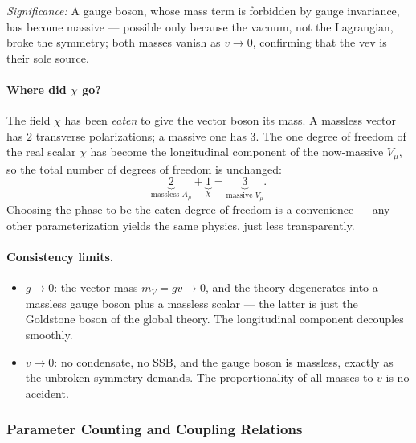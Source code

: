 \textit{Significance:} A gauge boson, whose mass term is forbidden by gauge invariance, has become massive --- possible only because the vacuum, not the Lagrangian, broke the symmetry; both masses vanish as $v\to0$, confirming that the vev is their sole source.

\paragraph{Where did $\chi$ go?}
The field $\chi$ has been \emph{eaten} to give the vector boson its mass. A massless vector has $2$ transverse polarizations; a massive one has $3$. The one degree of freedom of the real scalar $\chi$ has become the longitudinal component of the now-massive $V_\mu$, so the total number of degrees of freedom is unchanged:
\begin{equation}
  \underbrace{2}_{\text{massless }A_\mu}+\underbrace{1}_{\chi}
  =\underbrace{3}_{\text{massive }V_\mu} .
  \label{eq:lec17:dof}
\end{equation}
Choosing the phase to be the eaten degree of freedom is a convenience --- any other parameterization yields the same physics, just less transparently.

\paragraph{Consistency limits.}
\begin{itemize}
  \item $g\to0$: the vector mass $m_V=gv\to0$, and the theory degenerates into a massless gauge boson plus a massless scalar --- the latter is just the Goldstone boson of the global theory. The longitudinal component decouples smoothly.
  \item $v\to0$: no condensate, no SSB, and the gauge boson is massless, exactly as the unbroken symmetry demands. The proportionality of all masses to $v$ is no accident.
\end{itemize}


\subsubsection*{Parameter Counting and Coupling Relations}

